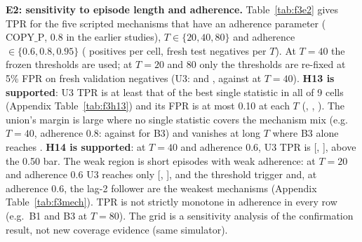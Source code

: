 \documentclass[11pt]{article}
\begin{document}
\textbf{E2: sensitivity to episode length and adherence.} Table~\ref{tab:f3e2} gives TPR for the five scripted mechanisms that have an adherence parameter ($\mathrm{COPY\_P}$, 0.8 in the earlier studies), $T\in\{20,40,80\}$ and adherence $\in\{0.6,0.8,0.95\}$ (\fNPosCell{} positives per cell, \fNNegT{} fresh test negatives per $T$). At $T{=}40$ the frozen thresholds are used; at $T{=}20$ and $80$ only the thresholds are re-fixed at 5\% FPR on \fNValT{} fresh validation negatives (U3: \fThrTwentyUthree{} and \fThrEightyUthree{}, against \fThrFortyUthree{} at $T{=}40$). \textbf{H13 is supported}: U3 TPR is at least that of the best single statistic in all \fHthirteenCellsOk{} of 9 cells (Appendix Table~\ref{tab:f3h13}) and its FPR is at most 0.10 at each $T$ (\fFprTwentyUthree{}, \fFprFortyUthree{}, \fFprEightyUthree{}). The union's margin is large where no single statistic covers the mechanism mix (e.g.\ $T{=}40$, adherence 0.8: \fTprFortyPzeroeightUthree{} against \fTprFortyPzeroeightBthree{} for B3) and vanishes at long $T$ where B3 alone reaches \fTprEightyPzeroeightBthree{}. \textbf{H14 is supported}: at $T{=}40$ and adherence 0.6, U3 TPR is \fTprFortyPzerosixUthree{} [\fTprFortyPzerosixUthreeLo{}, \fTprFortyPzerosixUthreeHi{}], above the 0.50 bar. The weak region is short episodes with weak adherence: at $T{=}20$ and adherence 0.6 U3 reaches only \fTprTwentyPzerosixUthree{} [\fTprTwentyPzerosixUthreeLo{}, \fTprTwentyPzerosixUthreeHi{}], and the threshold trigger and, at adherence 0.6, the lag-2 follower are the weakest mechanisms (Appendix Table~\ref{tab:f3mech}). TPR is not strictly monotone in adherence in every row (e.g.\ B1 and B3 at $T{=}80$). The grid is a sensitivity analysis of the confirmation result, not new coverage evidence (same simulator).
\begin{table}[t]\centering\small\resizebox{\linewidth}{!}{}
\caption{E2: TPR by episode length $T$ and adherence (80 collusive episodes per cell: 5 mechanisms $\times$ 16 seeds) with 95\% episode-bootstrap CIs; last column is the FPR on 120 fresh test negatives. $T{=}40$ uses the frozen thresholds; $T{=}20, 80$ use thresholds re-fixed on fresh validation negatives.}\label{tab:f3e2}\end{table}
\end{document}
